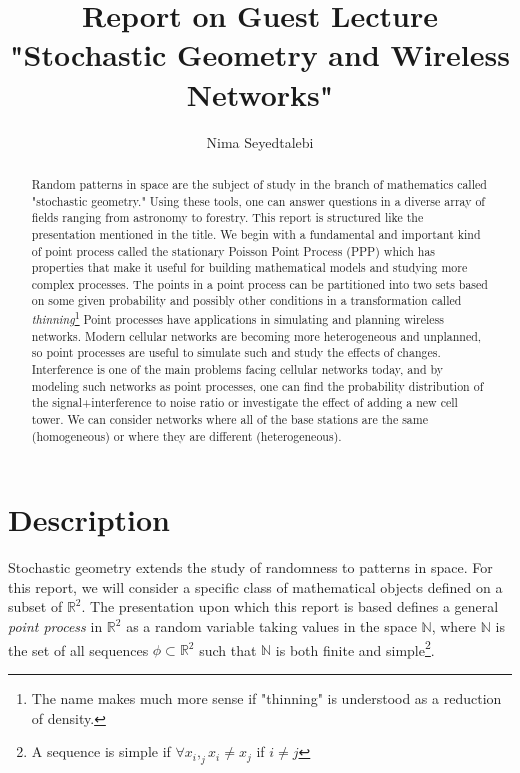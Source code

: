 \documentclass[]{article}
\title{Report on Guest Lecture "Stochastic Geometry and Wireless Networks"}
\author{Nima Seyedtalebi}
\begin{document}
\maketitle

\begin{abstract}
Random patterns in space are the subject of study in the branch of mathematics called "stochastic geometry." Using these tools, one can answer questions in a diverse array of fields ranging from astronomy to forestry. This report is structured like the presentation mentioned in the title. We begin with a fundamental and important kind of point process called the stationary Poisson Point Process (PPP) which has properties that make it useful for building mathematical models and studying more complex processes. The points in a point process can be partitioned into two sets based on some given probability and possibly other conditions in a transformation called \textit{thinning}\footnote{The name makes much more sense if "thinning" is understood as a reduction of density.}
Point processes have applications in simulating and planning wireless networks. Modern cellular networks are becoming more heterogeneous and unplanned, so point processes are useful to simulate such and study the effects of changes. Interference is one of the main problems facing cellular networks today, and by modeling such networks as point processes, one can find the probability distribution of the signal+interference to noise ratio or investigate the effect of adding a new cell tower. We can consider networks where all of the base stations are the same (homogeneous) or where they are different (heterogeneous).
\end{abstract}

\section{Description}
Stochastic geometry extends the study of randomness to patterns in space. For this report, we will consider a specific class of mathematical objects defined on a subset of $\mathbb{R}^2$.  The presentation upon which this report is based defines a general \textit{point process} in $\mathbb{R}^2$ as a random variable taking values in the space $\mathbb{N}$, where $\mathbb{N}$ is the set of all sequences $\phi \subset \mathbb{R}^2$ such that $\mathbb{N}$ is both finite and simple\footnote{A sequence is simple if $\forall x_i,_j x_i \neq x_j$ if $i \neq j$}.
\end{document}

